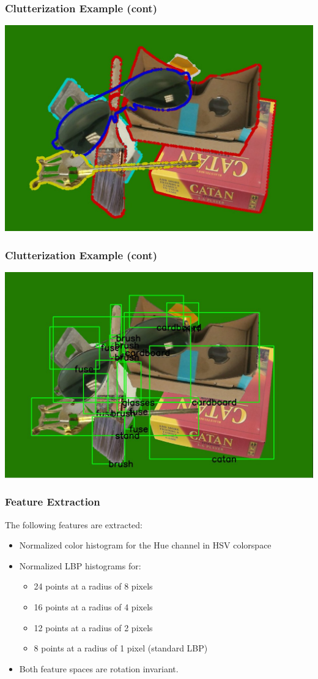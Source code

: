 \documentclass{beamer}
\begin{document}
\begin{frame}
  \frametitle{Clutterization Example (cont)}
  \includegraphics[width=\textwidth]{clutter.jpg}
\end{frame}

\begin{frame}
  \frametitle{Clutterization Example (cont)}
  \includegraphics[width=\textwidth]{genTruth.jpg}
\end{frame}

\begin{frame}
  \frametitle{Feature Extraction}
  The following features are extracted:
  \begin{itemize}
    \item Normalized color histogram for the Hue channel in HSV colorspace
    \item Normalized LBP histograms for:
    \begin{itemize}
      \item 24 points at a radius of 8 pixels
      \item 16 points at a radius of 4 pixels
      \item 12 points at a radius of 2 pixels
      \item 8 points at a radius of 1 pixel (standard LBP)
    \end{itemize}
    \item Both feature spaces are rotation invariant.
  \end{itemize}
\end{frame}
\end{document}
